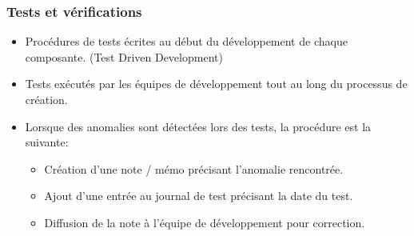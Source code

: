 \documentclass[xcolor=table]{beamer}
\begin{document}
\begin{frame}
  \frametitle{Tests et vérifications}
  \begin{itemize}
   \item Procédures de tests écrites au début du développement de chaque composante. (Test Driven Development)
   \item Tests exécutés par les équipes de développement tout au long du processus de création.
   \item  Lorsque des anomalies sont détectées lors des tests, la procédure est la suivante:
    \begin{itemize}
     \item Création d'une note / mémo précisant l'anomalie rencontrée.
     \item Ajout d'une entrée au journal de test précisant la date du test.
     \item Diffusion de la note à l'équipe de développement pour correction.
    \end{itemize}
  \end{itemize}
\end{frame}
\end{document}
